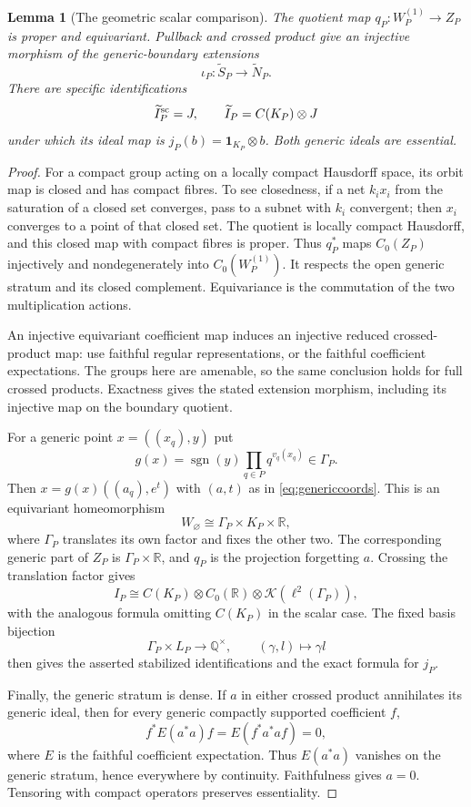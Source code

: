 \documentclass[11pt]{article}
\newcommand{\Q}{\mathbb Q}
\newcommand{\R}{\mathbb R}
\newcommand{\K}{\mathcal K}
\newcommand{\sgn}{\operatorname{sgn}}
\newcommand{\one}{\mathbf 1}
\newtheorem{lemma}[theorem]{Lemma}
\theoremstyle{definition}
\theoremstyle{remark}
\begin{document}
\begin{lemma}[The geometric scalar comparison]\label{lem:scalarcomparison}
The quotient map $q_P:W_P^{(1)}\to Z_P$ is proper and equivariant. Pullback and crossed product give an injective morphism of the generic-boundary extensions
\[
 \iota_P:\widetilde S_P\longrightarrow\widetilde N_P.
\]
There are specific identifications
\[
 \widetilde I_P^{\rm sc}=J,\qquad
 \widetilde I_P=C(K_P)\otimes J
\]
under which its ideal map is $j_P(b)=\one_{K_P}\otimes b$. Both generic ideals are essential.
\end{lemma}
\begin{proof}
For a compact group acting on a locally compact Hausdorff space, its orbit map is closed and has compact fibres. To see closedness, if a net $k_i x_i$ from the saturation of a closed set converges, pass to a subnet with $k_i$ convergent; then $x_i$ converges to a point of that closed set. The quotient is locally compact Hausdorff, and this closed map with compact fibres is proper. Thus $q_P^*$ maps $C_0(Z_P)$ injectively and nondegenerately into $C_0(W_P^{(1)})$. It respects the open generic stratum and its closed complement. Equivariance is the commutation of the two multiplication actions.

An injective equivariant coefficient map induces an injective reduced crossed-product map: use faithful regular representations, or the faithful coefficient expectations. The groups here are amenable, so the same conclusion holds for full crossed products. Exactness gives the stated extension morphism, including its injective map on the boundary quotient.

For a generic point $x=((x_q),y)$ put
\[
 g(x)=\sgn(y)\prod_{q\in P}q^{v_q(x_q)}\in\Gamma_P.
\]
Then $x=g(x)((a_q),e^t)$ with $(a,t)$ as in \eqref{eq:genericcoords}. This is an equivariant homeomorphism
\[
 W_\varnothing\cong\Gamma_P\times K_P\times\R,
\]
where $\Gamma_P$ translates its own factor and fixes the other two. The corresponding generic part of $Z_P$ is $\Gamma_P\times\R$, and $q_P$ is the projection forgetting $a$. Crossing the translation factor gives
\[
 I_P\cong C(K_P)\otimes C_0(\R)\otimes\K(\ell^2(\Gamma_P)),
\]
with the analogous formula omitting $C(K_P)$ in the scalar case. The fixed basis bijection
\[
 \Gamma_P\times L_P\longrightarrow\Q^\times,
 \qquad(\gamma,l)\longmapsto\gamma l
\]
then gives the asserted stabilized identifications and the exact formula for $j_P$.

Finally, the generic stratum is dense. If $a$ in either crossed product annihilates its generic ideal, then for every generic compactly supported coefficient $f$,
\[
 f^*E(a^*a)f=E(f^*a^*af)=0,
\]
where $E$ is the faithful coefficient expectation. Thus $E(a^*a)$ vanishes on the generic stratum, hence everywhere by continuity. Faithfulness gives $a=0$. Tensoring with compact operators preserves essentiality.
\end{proof}
\end{document}
